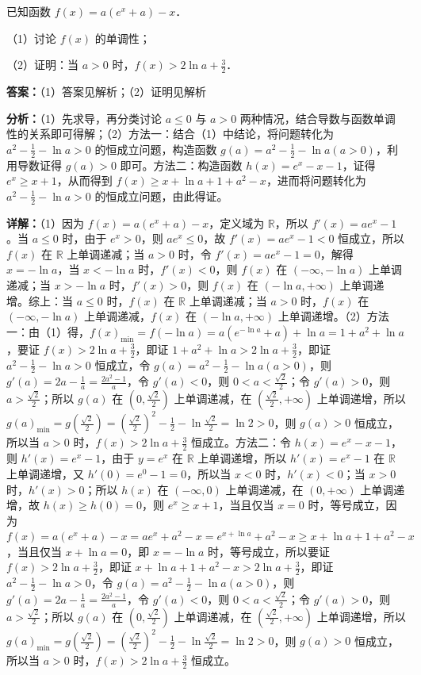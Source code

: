 \begin{question}[points=12]
已知函数 $f(x)=a(e^x+a)-x$．

（1）讨论 $f(x)$ 的单调性；

（2）证明：当 $a>0$ 时，$f(x)>2\ln a+\frac{3}{2}$．
\begin{solution}
\textbf{答案：}（1）答案见解析；（2）证明见解析

\textbf{分析：}（1）先求导，再分类讨论 $a\leq 0$ 与 $a>0$ 两种情况，结合导数与函数单调性的关系即可得解；（2）方法一：结合（1）中结论，将问题转化为 $a^2-\frac{1}{2}-\ln a>0$ 的恒成立问题，构造函数 $g(a)=a^2-\frac{1}{2}-\ln a(a>0)$，利用导数证得 $g(a)>0$ 即可。方法二：构造函数 $h(x)=e^x-x-1$，证得 $e^x\geq x+1$，从而得到 $f(x)\geq x+\ln a+1+a^2-x$，进而将问题转化为 $a^2-\frac{1}{2}-\ln a>0$ 的恒成立问题，由此得证。

\textbf{详解：}（1）因为 $f(x)=a(e^x+a)-x$，定义域为 $\mathbb{R}$，所以 $f'(x)=ae^x-1$。当 $a\leq 0$ 时，由于 $e^x>0$，则 $ae^x\leq 0$，故 $f'(x)=ae^x-1<0$ 恒成立，所以 $f(x)$ 在 $\mathbb{R}$ 上单调递减；当 $a>0$ 时，令 $f'(x)=ae^x-1=0$，解得 $x=-\ln a$，当 $x<-\ln a$ 时，$f'(x)<0$，则 $f(x)$ 在 $(-\infty,-\ln a)$ 上单调递减；当 $x>-\ln a$ 时，$f'(x)>0$，则 $f(x)$ 在 $(-\ln a,+\infty)$ 上单调递增。综上：当 $a\leq 0$ 时，$f(x)$ 在 $\mathbb{R}$ 上单调递减；当 $a>0$ 时，$f(x)$ 在 $(-\infty,-\ln a)$ 上单调递减，$f(x)$ 在 $(-\ln a,+\infty)$ 上单调递增。（2）方法一：由（1）得，$f(x)_{\min}=f(-\ln a)=a(e^{-\ln a}+a)+\ln a=1+a^2+\ln a$，要证 $f(x)>2\ln a+\frac{3}{2}$，即证 $1+a^2+\ln a>2\ln a+\frac{3}{2}$，即证 $a^2-\frac{1}{2}-\ln a>0$ 恒成立，令 $g(a)=a^2-\frac{1}{2}-\ln a(a>0)$，则 $g'(a)=2a-\frac{1}{a}=\frac{2a^2-1}{a}$，令 $g'(a)<0$，则 $0<a<\frac{\sqrt{2}}{2}$；令 $g'(a)>0$，则 $a>\frac{\sqrt{2}}{2}$；所以 $g(a)$ 在 $(0,\frac{\sqrt{2}}{2})$ 上单调递减，在 $(\frac{\sqrt{2}}{2},+\infty)$ 上单调递增，所以 $g(a)_{\min}=g(\frac{\sqrt{2}}{2})=(\frac{\sqrt{2}}{2})^2-\frac{1}{2}-\ln\frac{\sqrt{2}}{2}=\ln2>0$，则 $g(a)>0$ 恒成立，所以当 $a>0$ 时，$f(x)>2\ln a+\frac{3}{2}$ 恒成立。方法二：令 $h(x)=e^x-x-1$，则 $h'(x)=e^x-1$，由于 $y=e^x$ 在 $\mathbb{R}$ 上单调递增，所以 $h'(x)=e^x-1$ 在 $\mathbb{R}$ 上单调递增，又 $h'(0)=e^0-1=0$，所以当 $x<0$ 时，$h'(x)<0$；当 $x>0$ 时，$h'(x)>0$；所以 $h(x)$ 在 $(-\infty,0)$ 上单调递减，在 $(0,+\infty)$ 上单调递增，故 $h(x)\geq h(0)=0$，则 $e^x\geq x+1$，当且仅当 $x=0$ 时，等号成立，因为 $f(x)=a(e^x+a)-x=ae^x+a^2-x=e^{x+\ln a}+a^2-x\geq x+\ln a+1+a^2-x$，当且仅当 $x+\ln a=0$，即 $x=-\ln a$ 时，等号成立，所以要证 $f(x)>2\ln a+\frac{3}{2}$，即证 $x+\ln a+1+a^2-x>2\ln a+\frac{3}{2}$，即证 $a^2-\frac{1}{2}-\ln a>0$，令 $g(a)=a^2-\frac{1}{2}-\ln a(a>0)$，则 $g'(a)=2a-\frac{1}{a}=\frac{2a^2-1}{a}$，令 $g'(a)<0$，则 $0<a<\frac{\sqrt{2}}{2}$；令 $g'(a)>0$，则 $a>\frac{\sqrt{2}}{2}$；所以 $g(a)$ 在 $(0,\frac{\sqrt{2}}{2})$ 上单调递减，在 $(\frac{\sqrt{2}}{2},+\infty)$ 上单调递增，所以 $g(a)_{\min}=g(\frac{\sqrt{2}}{2})=(\frac{\sqrt{2}}{2})^2-\frac{1}{2}-\ln\frac{\sqrt{2}}{2}=\ln2>0$，则 $g(a)>0$ 恒成立，所以当 $a>0$ 时，$f(x)>2\ln a+\frac{3}{2}$ 恒成立。
\end{solution}
\end{question}

